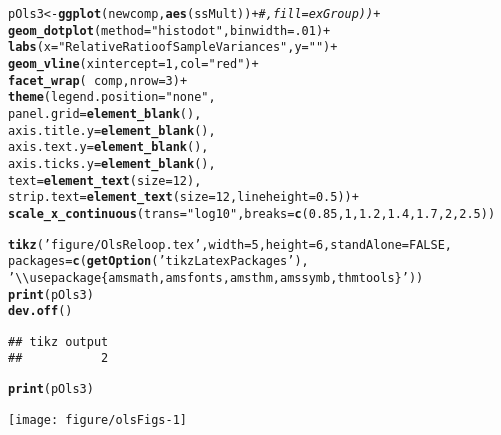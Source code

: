 \documentclass[12pt]{article}\usepackage[]{graphicx}\usepackage[]{xcolor}
\makeatletter
\def\maxwidth{ %
  \ifdim\Gin@nat@width>\linewidth
    \linewidth
  \else
    \Gin@nat@width
  \fi
}
\newcommand{\hlnum}[1]{\textcolor[rgb]{0.686,0.059,0.569}{#1}}%
\newcommand{\hlstr}[1]{\textcolor[rgb]{0.192,0.494,0.8}{#1}}%
\newcommand{\hlcom}[1]{\textcolor[rgb]{0.678,0.584,0.686}{\textit{#1}}}%
\newcommand{\hlopt}[1]{\textcolor[rgb]{0,0,0}{#1}}%
\newcommand{\hlstd}[1]{\textcolor[rgb]{0.345,0.345,0.345}{#1}}%
\newcommand{\hlkwb}[1]{\textcolor[rgb]{0.69,0.353,0.396}{#1}}%
\newcommand{\hlkwc}[1]{\textcolor[rgb]{0.333,0.667,0.333}{#1}}%
\newcommand{\hlkwd}[1]{\textcolor[rgb]{0.737,0.353,0.396}{\textbf{#1}}}%
\newenvironment{kframe}{%
 \def\at@end@of@kframe{}%
 \ifinner\ifhmode%
  \def\at@end@of@kframe{\end{minipage}}%
  \begin{minipage}{\columnwidth}%
 \fi\fi%
 \def\FrameCommand##1{\hskip\@totalleftmargin \hskip-\fboxsep
 \colorbox{shadecolor}{##1}\hskip-\fboxsep
     \hskip-\linewidth \hskip-\@totalleftmargin \hskip\columnwidth}%
 \MakeFramed {\advance\hsize-\width
   \@totalleftmargin\z@ \linewidth\hsize
   \@setminipage}}%
 {\par\unskip\endMakeFramed%
 \at@end@of@kframe}
\newenvironment{knitrout}{}{} %
\makeatother
\begin{document}
\begin{knitrout}
\color{fgcolor}\begin{kframe}
\begin{alltt}
\hlstd{pOls3} \hlkwb{<-} \hlkwd{ggplot}\hlstd{(newcomp,}\hlkwd{aes}\hlstd{(ssMult))}\hlopt{+}\hlcom{#,fill=exGroup))+}
    \hlkwd{geom_dotplot}\hlstd{(} \hlkwc{method}\hlstd{=}\hlstr{"histodot"}\hlstd{,} \hlkwc{binwidth} \hlstd{=} \hlnum{.01} \hlstd{)}  \hlopt{+}
    \hlkwd{labs}\hlstd{(} \hlkwc{x} \hlstd{=} \hlstr{"Relative Ratio of Sample Variances"}\hlstd{,} \hlkwc{y}\hlstd{=}\hlstr{""} \hlstd{)} \hlopt{+}
    \hlkwd{geom_vline}\hlstd{(} \hlkwc{xintercept} \hlstd{=} \hlnum{1}\hlstd{,} \hlkwc{col}\hlstd{=}\hlstr{"red"} \hlstd{)} \hlopt{+}
    \hlkwd{facet_wrap}\hlstd{(}\hlopt{~}\hlstd{comp,}\hlkwc{nrow}\hlstd{=}\hlnum{3}\hlstd{)}\hlopt{+}
    \hlkwd{theme}\hlstd{(}\hlkwc{legend.position} \hlstd{=} \hlstr{"none"}\hlstd{,}
        \hlkwc{panel.grid} \hlstd{=} \hlkwd{element_blank}\hlstd{(),}
        \hlkwc{axis.title.y} \hlstd{=} \hlkwd{element_blank}\hlstd{(),}
        \hlkwc{axis.text.y}\hlstd{=} \hlkwd{element_blank}\hlstd{(),}
        \hlkwc{axis.ticks.y} \hlstd{=} \hlkwd{element_blank}\hlstd{(),}
        \hlkwc{text}\hlstd{=}\hlkwd{element_text}\hlstd{(}\hlkwc{size}\hlstd{=}\hlnum{12}\hlstd{),}
        \hlkwc{strip.text}\hlstd{=}\hlkwd{element_text}\hlstd{(}\hlkwc{size}\hlstd{=}\hlnum{12}\hlstd{,}\hlkwc{lineheight}\hlstd{=}\hlnum{0.5}\hlstd{))}\hlopt{+}
  \hlkwd{scale_x_continuous}\hlstd{(}\hlkwc{trans}\hlstd{=}\hlstr{"log10"}\hlstd{,}\hlkwc{breaks}\hlstd{=}\hlkwd{c}\hlstd{(}\hlnum{0.85}\hlstd{,}\hlnum{1}\hlstd{,}\hlnum{1.2}\hlstd{,}\hlnum{1.4}\hlstd{,}\hlnum{1.7}\hlstd{,}\hlnum{2}\hlstd{,}\hlnum{2.5}\hlstd{))}


\hlkwd{tikz}\hlstd{(}\hlstr{'figure/OlsReloop.tex'}\hlstd{,}\hlkwc{width}\hlstd{=}\hlnum{5}\hlstd{,}\hlkwc{height}\hlstd{=}\hlnum{6}\hlstd{,}\hlkwc{standAlone}\hlstd{=}\hlnum{FALSE}\hlstd{,}
  \hlkwc{packages}\hlstd{=} \hlkwd{c}\hlstd{(}\hlkwd{getOption}\hlstd{(}\hlstr{'tikzLatexPackages'}\hlstd{),}
  \hlstr{'\textbackslash{}\textbackslash{}usepackage\{amsmath,amsfonts,amsthm,amssymb,thmtools\}'}\hlstd{))}
\hlkwd{print}\hlstd{(pOls3)}
\hlkwd{dev.off}\hlstd{()}
\end{alltt}
\begin{verbatim}
## tikz output 
##           2
\end{verbatim}
\begin{alltt}
\hlkwd{print}\hlstd{(pOls3)}
\end{alltt}
\end{kframe}
\texttt{[image: figure/olsFigs-1]} 
\end{knitrout}
\end{document}

